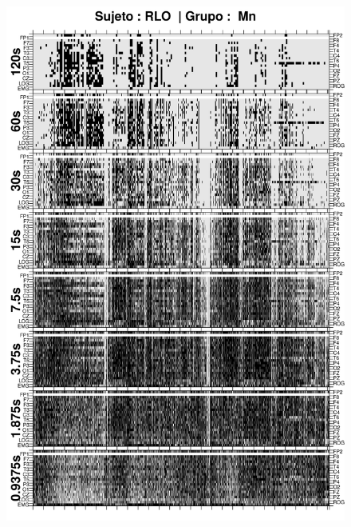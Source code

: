 \begin{figure}
\centering
\includegraphics[width=0.9\linewidth]
{./img_ejemplos/RLMN10SUE_comp_est_.png} 
\end{figure}

